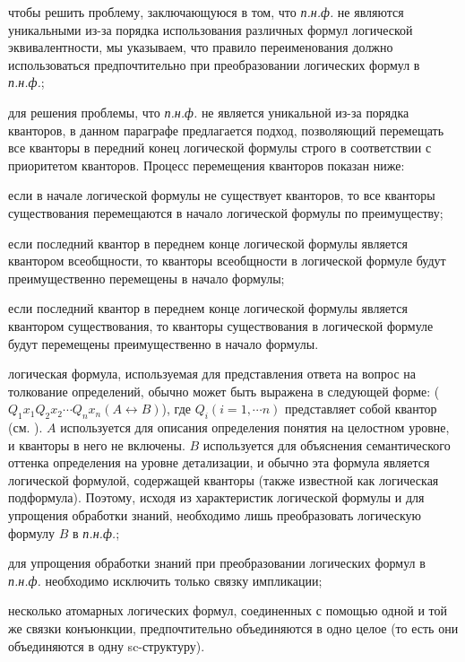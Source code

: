 \begin{textitemize}
	\item чтобы решить проблему, заключающуюся в том, что \textit{п.н.ф.} не являются уникальными из-за порядка использования различных формул логической эквивалентности, мы указываем, что правило переименования должно использоваться предпочтительно при преобразовании логических формул в \textit{п.н.ф.};
	
	\item для решения проблемы, что \textit{п.н.ф.} не является уникальной из-за порядка кванторов, в данном параграфе предлагается подход, позволяющий перемещать все кванторы в передний конец логической формулы строго в соответствии с приоритетом кванторов. Процесс перемещения кванторов показан ниже:
	
	\begin{textitemize}
		\item если в начале логической формулы не существует кванторов, то все кванторы существования перемещаются в начало логической формулы по преимуществу;
		
		\item если последний квантор в переднем конце логической формулы является квантором всеобщности, то кванторы всеобщности в логической формуле будут преимущественно перемещены в начало формулы;
		
		\item если последний квантор в переднем конце логической формулы является квантором существования, то кванторы существования в логической формуле будут перемещены преимущественно в начало формулы.
	\end{textitemize}
	
	\item логическая формула, используемая для представления ответа на вопрос на толкование определений, обычно может быть выражена в следующей форме: ($Q_{1}x_{1}Q_{2}x_{2}\cdots Q_{n}x_{n}(A\leftrightarrow B)$), где $Q_{i}\left ( i = 1, \cdots n \right )$ представляет собой квантор (см. ). $A$ используется для описания определения понятия на целостном уровне, и кванторы в него не включены. $B$ используется для объяснения семантического оттенка определения на уровне детализации, и обычно эта формула является логической формулой, содержащей кванторы (также известной как логическая подформула). Поэтому, исходя из характеристик логической формулы и для упрощения обработки знаний, необходимо лишь преобразовать логическую формулу $B$ в \textit{п.н.ф.};
	
	\item для упрощения обработки знаний при преобразовании логических формул в \textit{п.н.ф.} необходимо исключить только связку импликации;
	
	\item несколько атомарных логических формул, соединенных с помощью одной и той же связки конъюнкции, предпочтительно объединяются в одно целое (то есть они объединяются в одну sc-структуру).
	
\end{textitemize}

